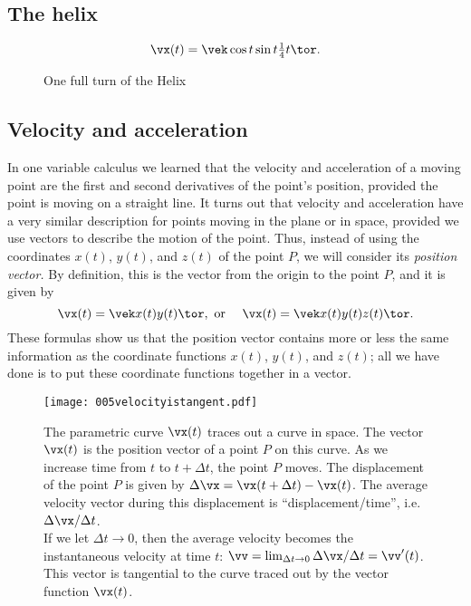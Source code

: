 \subsection{The helix}
\[
  \vx(t) = \vek \cos t \\ \sin t\\ \tfrac14 t\tor.
\]
\begin{figure}[h]
  \centering
  
  \caption{One full turn of the Helix}
\end{figure}

\subsection{Velocity and acceleration} %
\label{sec:veloc-accel}
In one variable calculus we learned that the velocity and acceleration
of a moving point are the first and second derivatives of the point's
position, provided the point is moving on a straight line.  It turns
out that velocity and acceleration have a very similar description for
points moving in the plane or in space, provided we use vectors to
describe the motion of the point.  Thus, instead of using the
coordinates $x(t)$, $y(t)$, and $z(t)$ of the point $P$, we will
consider its \emph{position vector.}  By definition, this is the
vector from the origin to the point $P$, and it is given by
\[
\vx(t) = \vek x(t)\\ y(t)\tor, \text{ or }\quad \vx(t) = \vek x(t)\\
y(t) \\ z(t)\tor.
\]
These formulas show us that the position vector contains more or less
the same information as the coordinate functions $x(t)$, $y(t)$, and
$z(t)$; all we have done is to put these coordinate functions together
in a vector.

\begin{figure}[t]
  \centering
  \texttt{[image: 005velocityistangent.pdf]}
  \caption{The parametric curve $\vx(t)$ traces out a curve in space.
    The vector $\vx(t)$ is the position vector of a point $P$ on this
    curve.  As we increase time from $t$ to $ t+\Delta t$, the point
    $P$ moves.  The displacement of the point $P$ is given by
    $\Delta\vx = \vx(t+\Delta t) - \vx(t)$.  The average velocity
    vector during
    this displacement is ``displacement/time'', i.e.\ $\Delta \vx/\Delta t$.\\
    \null\qquad If we let $\Delta t\to 0$, then the average velocity
    becomes the instantaneous velocity at time $t$: $\vv =
    \lim_{\Delta t\to0}\Delta\vx/\Delta t = \vv'(t)$.  This vector is
    tangential to the curve traced out by the vector function
    $\vx(t)$. }
  \label{fig:05velocity-is-deriv-of-position}
\end{figure}
